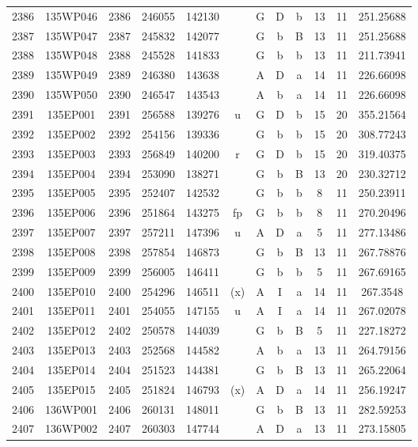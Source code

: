 \begin{tabular}{|*{12}{c|}}
2386 & 135WP046 & 2386 & 246055 & 142130 &  & G & D & b & 13 & 11 & 251.25688 \\ 
2387 & 135WP047 & 2387 & 245832 & 142077 &  & G & b & B & 13 & 11 & 251.25688 \\ 
2388 & 135WP048 & 2388 & 245528 & 141833 &  & G & b & b & 13 & 11 & 211.73941 \\ 
2389 & 135WP049 & 2389 & 246380 & 143638 &  & A & D & a & 14 & 11 & 226.66098 \\ 
2390 & 135WP050 & 2390 & 246547 & 143543 &  & A & b & a & 14 & 11 & 226.66098 \\ 
2391 & 135EP001 & 2391 & 256588 & 139276 & u & G & D & b & 15 & 20 & 355.21564 \\ 
2392 & 135EP002 & 2392 & 254156 & 139336 &  & G & b & b & 15 & 20 & 308.77243 \\ 
2393 & 135EP003 & 2393 & 256849 & 140200 & r & G & D & b & 15 & 20 & 319.40375 \\ 
2394 & 135EP004 & 2394 & 253090 & 138271 &  & G & b & B & 13 & 20 & 230.32712 \\ 
2395 & 135EP005 & 2395 & 252407 & 142532 &  & G & b & b & 8 & 11 & 250.23911 \\ 
2396 & 135EP006 & 2396 & 251864 & 143275 & fp & G & b & b & 8 & 11 & 270.20496 \\ 
2397 & 135EP007 & 2397 & 257211 & 147396 & u & A & D & a & 5 & 11 & 277.13486 \\ 
2398 & 135EP008 & 2398 & 257854 & 146873 &  & G & b & B & 13 & 11 & 267.78876 \\ 
2399 & 135EP009 & 2399 & 256005 & 146411 &  & G & b & b & 5 & 11 & 267.69165 \\ 
2400 & 135EP010 & 2400 & 254296 & 146511 & (x) & A & I & a & 14 & 11 & 267.3548 \\ 
2401 & 135EP011 & 2401 & 254055 & 147155 & u & A & I & a & 14 & 11 & 267.02078 \\ 
2402 & 135EP012 & 2402 & 250578 & 144039 &  & G & b & B & 5 & 11 & 227.18272 \\ 
2403 & 135EP013 & 2403 & 252568 & 144582 &  & A & b & a & 13 & 11 & 264.79156 \\ 
2404 & 135EP014 & 2404 & 251523 & 144381 &  & G & b & B & 13 & 11 & 265.22064 \\ 
2405 & 135EP015 & 2405 & 251824 & 146793 & (x) & A & D & a & 14 & 11 & 256.19247 \\ 
2406 & 136WP001 & 2406 & 260131 & 148011 &  & G & b & B & 13 & 11 & 282.59253 \\ 
2407 & 136WP002 & 2407 & 260303 & 147744 &  & A & D & a & 13 & 11 & 273.15805 \\ 

\end{tabular}
